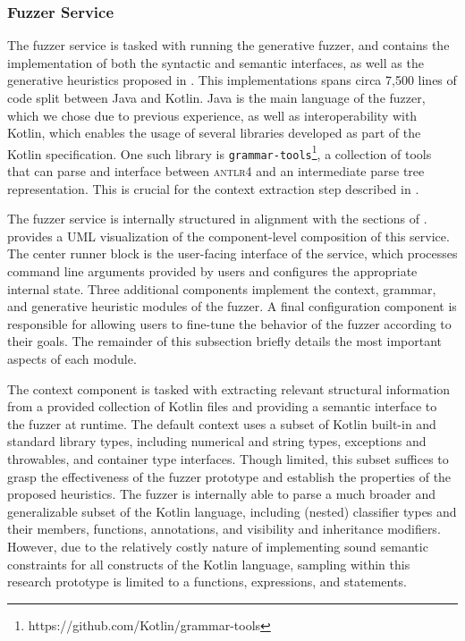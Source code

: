 \subsubsection{Fuzzer Service}

The fuzzer service is tasked with running the generative fuzzer,
and contains the implementation of both the syntactic and semantic interfaces,
as well as the generative heuristics proposed in .
This implementations spans circa 7,500 lines of code split between
Java and Kotlin.
Java is the main language of the fuzzer, which we chose due to previous experience, as well
as interoperability with Kotlin, which enables the usage of several libraries
developed as part of the Kotlin specification.
One such library is \texttt{grammar-tools}\footnote{https://github.com/Kotlin/grammar-tools},
a collection of tools that can parse and interface between \textsc{antlr4} and
an intermediate parse tree representation.
This is crucial for the context extraction step described in .

The fuzzer service is internally structured in alignment with
the sections of .
 provides a UML visualization
of the component-level composition of this service.
The center runner block is the user-facing interface
of the service, which processes command line arguments
provided by users and configures the appropriate internal state.
Three additional components implement the context, grammar,
and generative heuristic modules of the fuzzer.
A final configuration component is responsible for allowing
users to fine-tune the behavior of the fuzzer according to their goals.
The remainder of this subsection briefly details the most important
aspects of each module.

The context component is tasked with extracting relevant structural
information from a provided collection of Kotlin
files and providing a semantic interface to the fuzzer
at runtime.
The default context uses a subset of Kotlin built-in and standard library types,
including numerical and string types, exceptions and throwables, and container type interfaces.
Though limited, this subset suffices to grasp the effectiveness of the fuzzer prototype
and establish the properties of the proposed heuristics.
The fuzzer is internally able to parse a much broader and generalizable subset
of the Kotlin language, including (nested) classifier types
and their members, functions, annotations,
and visibility and inheritance modifiers.
However, due to the relatively costly nature of implementing sound
semantic constraints for all constructs of the Kotlin language,
sampling within this research prototype
is limited to a functions, expressions, and statements.

